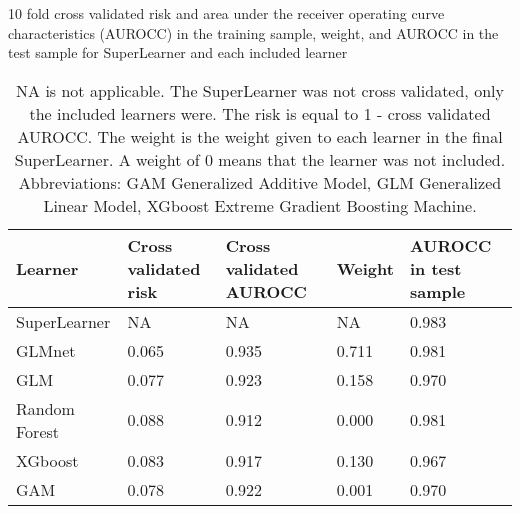 \documentclass{article}\usepackage[]{graphicx}\usepackage[]{color}
\begin{document}
\begin{table}[ht]
\centering
\caption{10 fold cross validated risk and area under the receiver operating curve characteristics (AUROCC) in the training sample, weight, and AUROCC in the test sample for SuperLearner and each included learner} 
\label{tab:coeff_risk}
\begin{tabular}{lllll}
  \hline
Learner & Cross validated risk & Cross validated AUROCC & Weight & AUROCC in test sample \\ 
  \hline
SuperLearner & NA & NA & NA & 0.983 \\ 
  GLMnet & 0.065 & 0.935 & 0.711 & 0.981 \\ 
  GLM & 0.077 & 0.923 & 0.158 & 0.970 \\ 
  Random Forest & 0.088 & 0.912 & 0.000 & 0.981 \\ 
  XGboost & 0.083 & 0.917 & 0.130 & 0.967 \\ 
  GAM & 0.078 & 0.922 & 0.001 & 0.970 \\ 
   \hline
\end{tabular}
\caption*{NA is not applicable. The SuperLearner was not cross validated, only the included learners were. The risk is equal to 1 - cross validated AUROCC. The weight is the weight given to each learner in the final SuperLearner. A weight of 0 means that the learner was not included. Abbreviations: GAM Generalized Additive Model, GLM Generalized Linear Model, XGboost Extreme Gradient Boosting Machine.} 
\end{table}
\end{document}
